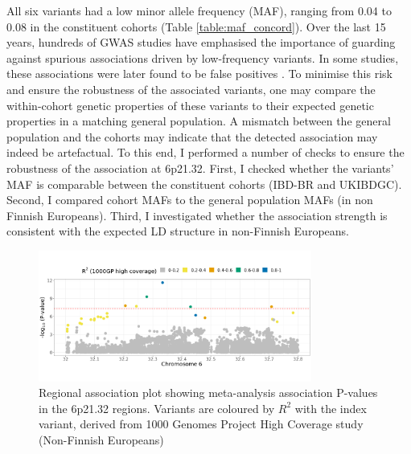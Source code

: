     
    All six variants had a low minor allele frequency (MAF), ranging from 0.04 to 0.08 in the constituent cohorts (Table \ref{table:maf_concord}). Over the last 15 years, hundreds of GWAS studies have emphasised the importance of guarding against spurious associations driven by low-frequency variants. In some studies, these associations were later found to be false positives \cite{Tabangin2009-gs}. To minimise this risk and ensure the robustness of the associated variants, one may compare the within-cohort genetic properties of these variants to their expected genetic properties in a matching general population. A mismatch between the general population and the cohorts may indicate that the detected association may indeed be artefactual. To this end, I performed a number of checks to ensure the robustness of the association at 6p21.32. First, I checked whether the variants' MAF is comparable between the constituent cohorts (IBD-BR and UKIBDGC). Second, I compared cohort MAFs to the general population MAFs (in non Finnish Europeans). Third, I investigated whether the association strength is consistent with the expected LD structure in non-Finnish Europeans. 
    \begin{figure}[H] 
      \centering    
      \includegraphics[width=0.8\textwidth]{Vector/regional_assoc_plot}
      \caption[Figure]{Regional association plot showing meta-analysis association P-values in the 6p21.32 regions. Variants are coloured by $R^{2}$ with the index variant, derived from 1000 Genomes Project High Coverage study (Non-Finnish Europeans)}
      \label{fig:regional_assoc_plot}
      \end{figure}
